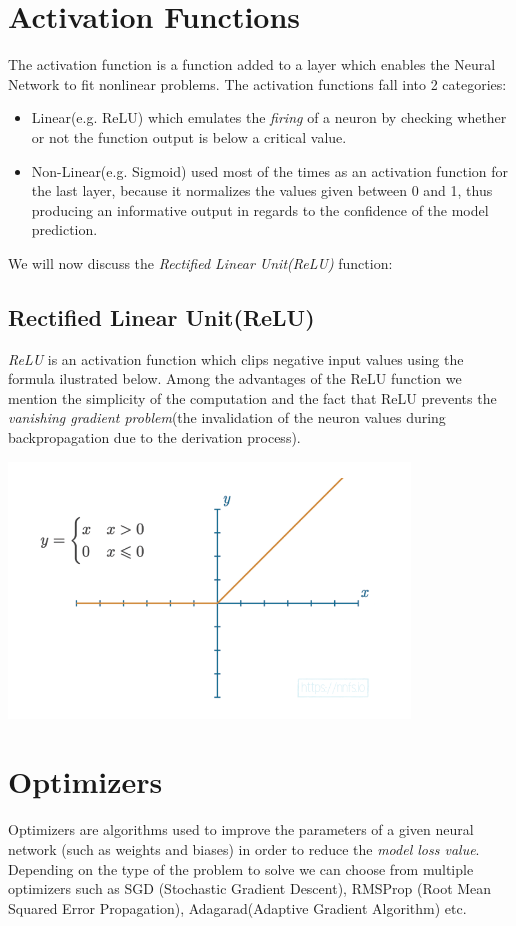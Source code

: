 \section{Activation Functions}
The activation function is a function added to a layer which enables the Neural Network to
fit nonlinear problems.
The activation functions fall into 2 categories:
\begin{itemize}
	\item Linear(e.g. ReLU) which emulates the \textit{firing} of a neuron by checking whether or not the
		function output is below a critical value.
	\item Non-Linear(e.g. Sigmoid) used most of the times as an activation function for the last layer, because it normalizes the values given between 0 and 1, thus producing an informative output in regards to the confidence of the model prediction.
\end{itemize}
We will now discuss the \textit{Rectified Linear Unit(ReLU)} function:
\subsection*{Rectified Linear Unit(ReLU)}
\textit{ReLU} is an activation function which clips negative input values using the formula ilustrated below. Among the
advantages of the ReLU function we mention the simplicity of the computation and the fact that ReLU prevents the
\textit{vanishing gradient problem}(the invalidation of the neuron values during backpropagation due to the derivation
process).
\begin{center}
	\includegraphics[width = 4.2in]{images/relu.png}
	\centerline{}
\label{relu}
\end{center}
\section{Optimizers}
Optimizers are algorithms used to improve the parameters of a given neural network (such as weights and biases)
in order to reduce the \textit{model loss value}.
Depending on the type of the problem to solve we can choose from multiple optimizers such as SGD
(Stochastic Gradient Descent), RMSProp (Root Mean Squared Error Propagation), Adagarad(Adaptive Gradient Algorithm) etc.

